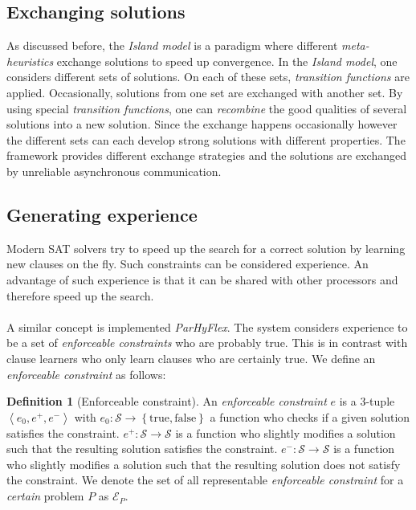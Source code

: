 \documentclass[a4paper,10pt]{article}
\newcommand{\seclab}[1]{\label{sec:#1}}
\newcommand{\tupl}[1]{\ensuremath{\left\langle #1 \right\rangle}}
\newcommand{\accl}[1]{\ensuremath{\left\{ #1 \right\}}}
\newcommand{\BoolSet}{\accl{\mbox{true},\mbox{false}}}
\newcommand{\calS}{\ensuremath{\mathcal{S}}}
\newcommand{\calE}{\ensuremath{\mathcal{E}}}
\theoremstyle{definition}
\newtheorem{definition}{Definition}
\begin{document}
\subsection{Exchanging solutions}
\seclab{exchangingsolutions}
As discussed before, the \emph{Island model}\cite{} is a paradigm where different \emph{meta-heuristics} exchange solutions to speed up convergence. %
In the \emph{Island model}, one considers different sets of solutions. On each of these sets, \emph{transition functions} are applied. Occasionally, solutions from one set are exchanged with another set.
By using special \emph{transition functions}, one can \emph{recombine} the good qualities of several solutions into a new solution. Since the exchange happens occasionally however the different sets can each develop strong solutions with different properties. The framework provides different exchange strategies and the solutions are exchanged by unreliable asynchronous communication.%

\subsection{Generating experience}
\seclab{generatingexperience}
Modern SAT solvers try to speed up the search for a correct solution by learning new clauses on the fly. Such constraints can be considered experience. An advantage of such experience is that it can be shared with other processors and therefore speed up the search.

\paragraph{}
A similar concept is implemented \emph{ParHyFlex}. The system considers experience to be a set of \emph{enforceable constraints} who are probably true. This is in contrast with clause learners who only learn clauses who are certainly true. We define an \emph{enforceable constraint} as follows:
\begin{definition}[Enforceable constraint]
An \emph{enforceable constraint} $e$ is a 3-tuple $\tupl{e_0,e^+,e^-}$ with $e_0:\calS\rightarrow\BoolSet$ a function who checks if a given solution satisfies the constraint. $e^+:\calS\rightarrow\calS$ is a function who slightly modifies a solution such that the resulting solution satisfies the constraint. $e^-:\calS\rightarrow\calS$ is a function who slightly modifies a solution such that the resulting solution does not satisfy the constraint. We denote the set of all representable \emph{enforceable constraint} for a \emph{certain} problem $P$ as $\calE_P$.
\end{definition}
\end{document}
